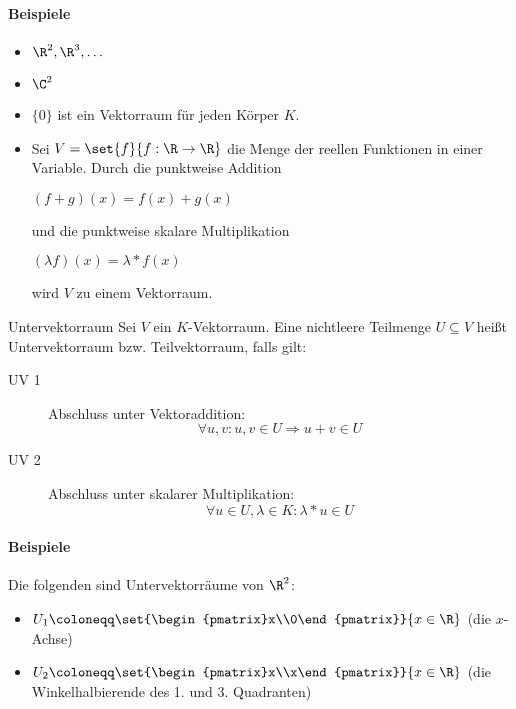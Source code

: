\paragraph{Beispiele}
\begin{multicols}{2}
  \begin{itemize}
    \item $\R^2, \R^3, \ldots$
    \item $\C^2$
    \item $\{0\}$ ist ein Vektorraum für jeden Körper $K$.
    \columnbreak
    \item Sei $V=\set{f}{f:\R\rightarrow\R}$ die Menge der reellen Funktionen in einer Variable. Durch die punktweise Addition

    $(f+g)(x)=f(x)+g(x)$

    und die punktweise skalare Multiplikation

    $(\lambda f)(x)=\lambda* f(x)$

    wird $V$ zu einem Vektorraum.
  \end{itemize}
\end{multicols}


\begin{definition}{Untervektorraum}
	Sei $V$ ein $K$-Vektorraum. Eine nichtleere Teilmenge $U\subseteq V$ heißt Untervektorraum bzw. Teilvektorraum, falls gilt:
	\begin{description}
	  \item[UV 1] Abschluss unter Vektoraddition:
	  \begin{equation*}
	    \forall u,v : u,v \in U \Rightarrow u+v\in U
	  \end{equation*}
	  \item[UV 2] Abschluss unter skalarer Multiplikation:
	  \begin{equation*}
	    \forall u\in U, \lambda\in K : \lambda* u \in U
	  \end{equation*}
	\end{description}
\end{definition}


\paragraph{Beispiele}
Die folgenden sind Untervektorräume von $\R^2$:
\begin{itemize}
  \item $U_1\coloneqq \set{\begin{pmatrix}x\\0\end{pmatrix}}{x\in\R}$ (die $x$-Achse)
  \item $U_2\coloneqq \set{\begin{pmatrix}x\\x\end{pmatrix}}{x\in\R}$ (die Winkelhalbierende des 1. und 3. Quadranten)
\end{itemize}


